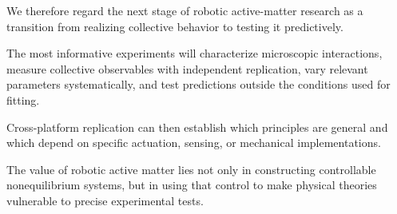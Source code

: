 We therefore regard the next stage
of robotic active-matter research
as a transition from realizing
collective behavior to testing
it predictively.

The most informative experiments
will characterize microscopic
interactions, measure collective
observables with independent
replication, vary relevant
parameters systematically,
and test predictions outside
the conditions used for fitting.

Cross-platform replication can
then establish which principles
are general and which depend
on specific actuation, sensing,
or mechanical implementations.

The value of robotic active matter
lies not only in constructing
controllable nonequilibrium systems,
but in using that control to make
physical theories vulnerable
to precise experimental tests.



